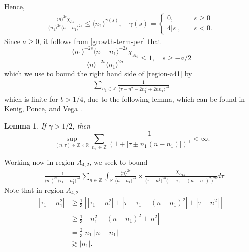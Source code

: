 \documentclass[12pt,reqno]{amsart}
\numberwithin{equation}{section}  %
\numberwithin{figure}{section}
\newcommand{\rr}{\mathbb{R}}
\newcommand{\zz}{\mathbb{Z}}
\theoremstyle{plain}
\newtheorem{lemma}{Lemma}
\theoremstyle{definition}
\theoremstyle{remark}
\begin{document}
%
Hence,
%
\begin{equation}
  \label{growth-term-per}
\begin{split}
  \frac{\langle n \rangle ^{2s} \chi_{A_{4}}}{\langle n_{1} \rangle ^{2s} \langle n -
  n_{1} \rangle ^{2s}} \le \langle n_{1} \rangle ^{\gamma(s)},
  \quad 
  \gamma(s) = 
  \begin{cases} 0, \quad & s \ge 0
    \\
    4|s|, \quad & s < 0.
  \end{cases}
\end{split}
\end{equation}
%
%
%
%
Since $a \ge 0$, it follows from \eqref{growth-term-per} that 
%
\begin{equation}
  \label{growth-term-control-per}
  \frac{\langle n_1 \rangle ^{-2s} \langle n - n_{1} \rangle
  ^{-2s}\chi_{A_{4}}}{\langle
n \rangle ^{-2s} \langle n_{1} \rangle
^{2a}} \le 1, \quad s \ge -a/2
\end{equation}
%
%
which we use to bound the right hand side of \eqref{region-a41} by
%
%
\begin{equation*}
\begin{split}
\sum_{n_{1} \in
\zz} 
\frac{1}{\langle \tau - n^{2} - 2n_{1}^{2} + 2nn_{1}  \rangle ^{2b}}
\end{split}
\end{equation*}
%
%
%
which is finite for $b > 1/4$, due to the following lemma, which can be found in
Kenig, Ponce, and Vega
\cite{Kenig-Ponce-Vega-1996-Quadratic-forms-for-the-1-D-semilinear}.
\begin{lemma}
  \label{lem:sum-estimate}
If $\gamma>1/2$, then
\begin{equation}\label{CI2}
\sup_{(n,\tau)\in \zz \times \rr}\sum_{n_1\in \zz}\frac{1}{(1+|\tau\pm
n_1(n-n_1)|)^{\gamma}}<\infty. 
\end{equation}
\end{lemma}
%
Working now in region $A_{4,2}$, we seek to bound 
\begin{equation}
  \label{region-4-2}
\begin{split}
  &  \frac{1}{\langle n_{1} \rangle ^{2s}
  \langle \tau_{1} - n_{1}^{2} \rangle
  ^{2a}} \sum_{n \in \zz} \int_{\rr} \frac{\langle n \rangle ^{2s}}{\langle
  n - n_{1}\rangle ^{2s}}  \times \frac{\chi_{A_{4,2}}}{\langle
  \tau - n^{2} \rangle ^{2b} \langle \tau - \tau_{1} - (n - n_{1})^{2} \rangle ^{2b}} d \tau 
\end{split}
\end{equation}
%
%
Note that in region $A_{4,2}$
\begin{equation}
  \label{smoothing-per-4-2}
\begin{split}
  | \tau_{1} - n_{1}^{2} |
  & \ge \frac{1}{3}\left[ | \tau_{1} - n_{1}^{2} | + | \tau -
  \tau_{1} - (n - n_{1})^{2}
  | + | \tau - n^{2} | \right]
  \\
  & \ge \frac{1}{3} | - n_{1}^{2} - (n - n_{1})^{2} + n^{2} |
  \\
  & = \frac{2}{3} | n_{1} | | n - n_{1} |
  \\
  & \gtrsim | n_{1} |.
\end{split}
\end{equation}
\end{document}
